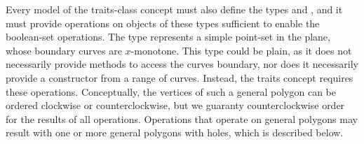 Every model of the traits-class concept must also define the types
 and , and it
must provide operations on objects of these types sufficient to enable
the boolean-set operations.  The type  represents a
simple point-set in the plane, whose boundary curves are $x$-monotone.
This type could be plain, as it does not necessarily provide methods
to access the curves boundary, nor does it necessarily provide a
constructor from a range of curves. Instead, the traits concept
requires these operations. Conceptually, the vertices of such a
general polygon can be ordered clockwise or counterclockwise, but we
guaranty counterclockwise order for the results of all
operations. Operations that operate on general polygons may result
with one or more general polygons with holes, which is described
below.


